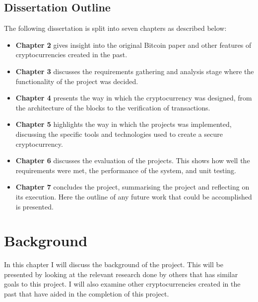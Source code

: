 \documentclass{l4proj}
\begin{document}
\section{Dissertation Outline}
The following dissertation is split into seven chapters as described below:
\begin{itemize}
    \item
        \textbf{Chapter 2} gives insight into the original Bitcoin paper and other features of cryptocurrencies
        created in the past.
    \item
        \textbf{Chapter 3} discusses the requirements gathering and analysis stage where the functionality
        of the project was decided.
    \item
        \textbf{Chapter 4} presents the way in which the cryptocurrency was designed, from the architecture of the blocks
        to the verification of transactions.
    \item
        \textbf{Chapter 5} highlights the way in which the projects was implemented, discussing the specific tools and 
        technologies used to create a secure cryptocurrency.
    \item
        \textbf{Chapter 6} discusses the evaluation of the projects. This shows how well the requirements were met, the
        performance of the system, and unit testing.
    \item
        \textbf{Chapter 7} concludes the project, summarising the project and reflecting on its execution. Here the
        outline of any future work that could be accomplished is presented.
\end{itemize}


\chapter{Background}
In this chapter I will discuss the background of the project. This will be presented by looking at the relevant research done by 
others that has similar goals to this project. I will also examine other cryptocurrencies created in the past that have aided 
in the completion of this project.
\end{document}
